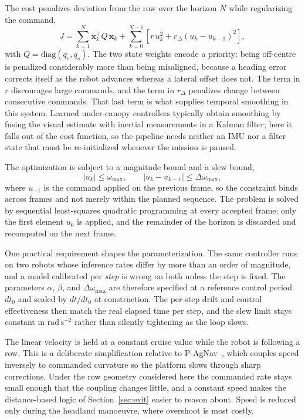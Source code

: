 \documentclass[conference]{IEEEtran}
\begin{document}
The cost penalizes deviation from the row over the horizon $N$ while
regularizing the command,
\begin{equation}
\label{eq:mpc_cost}
J = \sum_{k=1}^{N} \mathbf{x}_k^{\!\top} Q\, \mathbf{x}_k
  + \sum_{k=0}^{N-1} \left[ r\,u_k^2 + r_\Delta \left(u_k - u_{k-1}\right)^2 \right],
\end{equation}
with $Q = \mathrm{diag}(q_e, q_s)$. The two state weights encode a priority:
being off-centre is penalized considerably more than being misaligned, because
a heading error corrects itself as the robot advances whereas a lateral offset
does not. The term in $r$ discourages large commands, and the term in
$r_\Delta$ penalizes change between consecutive commands. That last term is
what supplies temporal smoothing in this system. Learned under-canopy
controllers typically obtain smoothing by fusing the visual estimate with
inertial measurements in a Kalman filter; here it falls out of the cost
function, so the pipeline needs neither an IMU nor a filter state that must be
re-initialized whenever the mission is paused.

The optimization is subject to a magnitude bound and a slew bound,
\begin{equation}
\label{eq:mpc_constraints}
\left|u_k\right| \le \omega_{\max},
\qquad
\left|u_k - u_{k-1}\right| \le \Delta\omega_{\max},
\end{equation}
where $u_{-1}$ is the command applied on the previous frame, so the constraint
binds across frames and not merely within the planned sequence. The problem is
solved by sequential least-squares quadratic programming at every accepted
frame; only the first element $u_0$ is applied, and the remainder of the
horizon is discarded and recomputed on the next frame.

One practical requirement shapes the parameterization. The same controller runs
on two robots whose inference rates differ by more than an order of magnitude,
and a model calibrated per \emph{step} is wrong on both unless the step is
fixed. The parameters $\alpha$, $\beta$, and $\Delta\omega_{\max}$ are therefore
specified at a reference control period $dt_0$ and scaled by $dt/dt_0$ at
construction. The per-step drift and control effectiveness then match the real
elapsed time per step, and the slew limit stays constant in
$\mathrm{rad}\,\mathrm{s}^{-2}$ rather than silently tightening as the loop
slows.

The linear velocity is held at a constant cruise value while the robot is
following a row. This is a deliberate simplification relative to
P-AgNav~\cite{kim2025pagnav}, which couples speed inversely to commanded
curvature so the platform slows through sharp corrections. Under the row
geometry considered here the commanded rate stays small enough that the
coupling changes little, and a constant speed makes the distance-based logic of
Section~\ref{sec:exit} easier to reason about. Speed is reduced only during the
headland manoeuvre, where overshoot is most costly.
\end{document}
